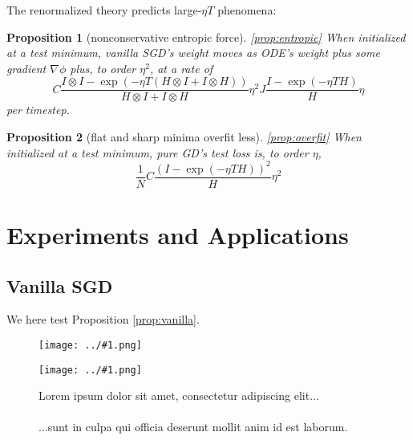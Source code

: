 \documentclass{article}
\newtheorem{prop}{Proposition}
\newcommand{\wrap}[1]{\left(#1\right)}
\newcommand{\plotplace}[3]{
    \begin{overpic}[width=#2, height=#3]{../plots/blank.png}
        \put( 5, 85){
            \begin{tabular}{p{#2-1.0cm}}
                #1
            \end{tabular}
        }
    \end{overpic}
}
\newcommand{\plotmoo}[3]{
    \texttt{[image: ../\#1.png]}
}
\newcommand{\lorem}[1]{
    Lorem ipsum dolor sit amet, consectetur adipiscing elit...\\
    \nopagebreak\vspace{#1cm} \ \\
    ...sunt in culpa qui officia deserunt mollit anim id est laborum.
}
\begin{document}
        The renormalized theory predicts large-$\eta T$ phenomena:
        \begin{prop}[nonconservative entropic force]\ref{prop:entropic}
            When initialized at a test minimum, vanilla SGD's weight moves as
            ODE's weight plus some gradient $\nabla\phi$ plus, to order
            $\eta^2$, at a rate of 
            $$
                C
                \frac{I\otimes I - \exp(-\eta T (H\otimes I + I\otimes H))}{H\otimes I + I\otimes H}
                \eta^2 J
                \frac{I - \exp(-\eta T H)}{H}
                \eta
            $$
            per timestep.
        \end{prop}

        \begin{prop}[flat and sharp minima overfit less]\ref{prop:overfit}
            When initialized at a test minimum, pure GD's test loss is, to
            order $\eta$, 
            $$
                \frac{1}{N} C \frac{\wrap{I - \exp(-\eta T H)}^2}{H} \eta^2
            $$
        \end{prop}


\section{Experiments and Applications}


    \subsection{Vanilla SGD}
        We here test Proposition \ref{prop:vanilla}. 
        \begin{figure}[h!]
            \centering
            \plotmoo{plots/test-vanilla-fashion}{0.48\columnwidth}{3.0cm} 
            \plotmoo{plots/gen-cifar}{0.48\columnwidth}{3.0cm}
            \caption{\lorem{2}}
        \end{figure}
    
\end{document}
